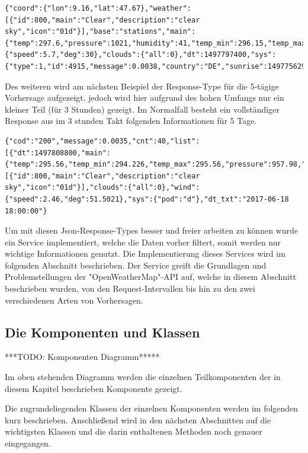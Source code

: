   \begin{lstlisting}
{"coord":{"lon":9.16,"lat":47.67},"weather":[{"id":800,"main":"Clear","description":"clear sky","icon":"01d"}],"base":"stations","main":{"temp":297.6,"pressure":1021,"humidity":41,"temp_min":296.15,"temp_max":298.15},"visibility":10000,"wind":{"speed":5.7,"deg":30},"clouds":{"all":0},"dt":1497797400,"sys":{"type":1,"id":4915,"message":0.0038,"country":"DE","sunrise":1497756293,"sunset":1497813872},"id":0,"name":"Konstanz","cod":200}
\end{lstlisting}

Des weiteren wird am nächsten Beispiel der Response-Type für die 5-tägige Vorhersage aufgezeigt, jedoch wird hier aufgrund des hohen Umfangs nur ein kleiner Teil (für 3 Stunden) gezeigt. Im Normalfall besteht ein vollständiger Response aus im 3 stunden Takt 
folgenden Informationen für 5 Tage.
 
  \begin{lstlisting}
{"cod":"200","message":0.0035,"cnt":40,"list":[{"dt":1497808800,"main":{"temp":295.56,"temp_min":294.226,"temp_max":295.56,"pressure":957.98,"sea_level":1034.02,"grnd_level":957.98,"humidity":53,"temp_kf":1.34},"weather":[{"id":800,"main":"Clear","description":"clear sky","icon":"01d"}],"clouds":{"all":0},"wind":{"speed":2.46,"deg":51.5021},"sys":{"pod":"d"},"dt_txt":"2017-06-18 18:00:00"}
\end{lstlisting}
\clearpage
Um mit diesen Json-Response-Types besser und freier arbeiten zu können wurde ein Service implementiert, welche die Daten vorher filtert, somit werden nur wichtige Informationen genutzt. Die Implementierung dieses Services wird im folgenden Abschnitt beschrieben. Der Service greift die Grundlagen und Problemstellungen der "OpenWeatherMap"-API auf, welche in diesem Abschnitt beschrieben wurden, von den Request-Intervallen bis hin zu den zwei verschiedenen Arten von Vorhersagen.

\subsection{Die Komponenten und Klassen}

***TODO: Komponenten Diagramm*****

Im oben stehenden Diagramm werden die einzelnen Teilkomponenten der in diesem Kapitel beschrieben Komponente gezeigt. 

Die zugrundeliegenden Klassen der einzelnen Komponenten werden im folgenden kurz beschrieben. Anschließend wird in den nächsten Abschnitten auf die wichtigsten Klassen und die darin enthaltenen Methoden noch genauer eingegangen. 

